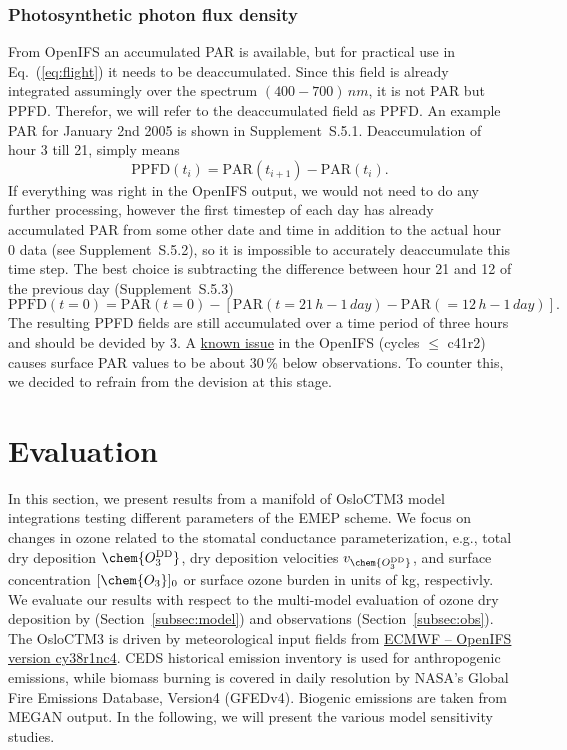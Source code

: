 \documentclass[gmd, manuscript]{copernicus}
\begin{document}
\subsubsection{Photosynthetic photon flux density}
From OpenIFS an accumulated PAR is available, but for practical use in Eq.~(\ref{eq:flight}) it needs to be deaccumulated. Since this field is already integrated assumingly over the spectrum $(400-700)\,\unit{nm}$, it is not PAR but PPFD. Therefor, we will refer to the deaccumulated field as PPFD. An example PAR for January 2nd 2005 is shown in Supplement~S.5.1. Deaccumulation of hour 3 till 21, simply means
\begin{equation}
  \text{PPFD}(t_i) = \text{PAR}(t_{i+1})-\text{PAR}(t_i).
\end{equation}
If everything was right in the OpenIFS output, we would not need to do any further processing, however the first timestep of each day has already accumulated PAR from some other date and time in addition to the actual hour 0 data (see Supplement~S.5.2), so it is impossible to accurately deaccumulate this time step. The best choice is subtracting the difference between hour 21 and 12 of the previous day (Supplement~S.5.3)
%
\begin{equation}
  \text{PPFD}(t=0) = \text{PAR}(t=0) - \left[\text{PAR}(t=21\,\unit{h}-1\,\unit{day})-\text{PAR}(=12\,\unit{h}-1\,\unit{day})\right].
\end{equation}
%
The resulting PPFD fields are still accumulated over a time period of three hours and should be devided by 3. A \href{https://confluence.ecmwf.int/display/CKB/ERA-Interim\%3A+surface+photosynthetically+active+radiation+\%28surface+PAR\%29+values+are+too+low}{known issue} in the OpenIFS (cycles $\le$ c41r2) causes surface PAR values to be about 30\,\unit{\%} below observations. To counter this, we decided to refrain from the devision at this stage.
\section{Evaluation}
\label{sec:eval}
In this section, we present results from a manifold of OsloCTM3 model integrations testing different parameters of the EMEP scheme. We focus on changes in ozone related to the stomatal conductance parameterization, e.g., total dry deposition $\chem{O_3^\text{DD}}$, dry deposition velocities $v_\chem{O_3^\text{DD}}$, and surface concentration $[\chem{O_3}]_0$ or surface ozone burden in units of \unit{kg}, respectivly. We evaluate our results with respect to the multi-model evaluation of ozone dry deposition by \citet{ACP:Hardacre2015} (Section~\ref{subsec:model}) and observations (Section~\ref{subsec:obs}). The OsloCTM3 is driven by meteorological input fields from \href{https://www.ecmwf.int/en/forecasts/documentation-and-support/evolution-ifs/cycle-38r1-summary-changes}{ECMWF -- OpenIFS version cy38r1nc4}. CEDS historical emission inventory is used for anthropogenic emissions, while biomass burning is covered in daily resolution by NASA's Global Fire Emissions Database, Version4 (GFEDv4). Biogenic emissions are taken from MEGAN output. In the following, we will present the various model sensitivity studies.
\end{document}
